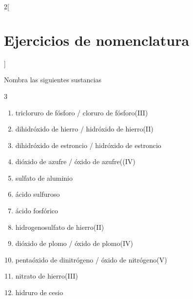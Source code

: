 \documentclass[10pt]{article}
\begin{document}
\begin{multicols*}{2}[
  \section{Ejercicios de nomenclatura}
  ]

\begin{exercise}[
    tags    = {inorgánica,nomenclatura,múltiple,2B},
    topics  = {química inorgánica,formulación,nomenclatura},
    source  = {Química 2B SAN 2016, p372, e6},
  ]
  Nombra las siguientes sustancias

  \begin{enumerate}\begin{multicols}{3}
    \item {}
    \item {}
    \item {}
    \item {}
    \item {}
    \item {}
    \item {}
    \item {}
    \item {}
    \item {}
    \item {}
    \item {}
  \end{multicols}\end{enumerate}
\end{exercise}

\begin{solution}
  \begin{enumerate}
    \item tricloruro de fósforo / cloruro de fósforo(III)
    \item dihidróxido de hierro / hidróxido de hierro(II)
    \item dihidróxido de estroncio / hidróxido de estroncio
    \item dióxido de azufre / óxido de azufre((IV)
    \item sulfato de aluminio
    \item ácido sulfuroso
    \item ácido fosfórico
    \item hidrogenosulfato de hierro(II)
    \item dióxido de plomo / óxido de plomo(IV)
    \item pentaóxido de dinitrógeno / óxido de nitrógeno(V)
    \item nitrato de hierro(III)
    \item hidruro de cesio
  \end{enumerate}
\end{solution}





\end{multicols*}
\end{document}
